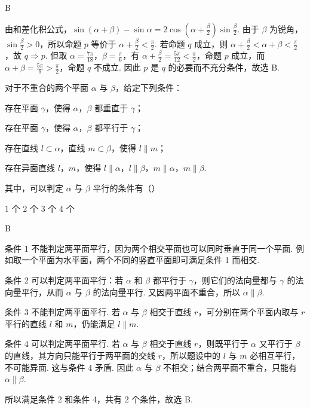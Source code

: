\begin{answer}
B
\end{answer}

\begin{solution}
由和差化积公式，\(\sin(\alpha+\beta)-\sin\alpha=2\cos\left(\alpha+\frac{\beta}{2}\right)\sin\frac{\beta}{2}\). 由于 \(\beta\) 为锐角，\(\sin\frac{\beta}{2}>0\)，所以命题 \(p\) 等价于 \(\alpha+\frac{\beta}{2}<\frac{\pi}{2}\). 若命题 \(q\) 成立，则 \(\alpha+\frac{\beta}{2}<\alpha+\beta<\frac{\pi}{2}\)，故 \(q\Rightarrow p\). 但取 \(\alpha=\frac{7\pi}{18}\)，\(\beta=\frac{\pi}{6}\)，有 \(\alpha+\frac{\beta}{2}=\frac{5\pi}{12}<\frac{\pi}{2}\)，命题 \(p\) 成立，而 \(\alpha+\beta=\frac{5\pi}{9}>\frac{\pi}{2}\)，命题 \(q\) 不成立. 因此 \(p\) 是 \(q\) 的必要而不充分条件，故选 B.
\end{solution}

\begin{problem}
对于不重合的两个平面 \(\alpha\) 与 \(\beta\)，给定下列条件：

\begin{circlelist}
\item 存在平面 \(\gamma\)，使得 \(\alpha\)，\(\beta\) 都垂直于 \(\gamma\)；
\item 存在平面 \(\gamma\)，使得 \(\alpha\)，\(\beta\) 都平行于 \(\gamma\)；
\item 存在直线 \(l \subset \alpha\)，直线 \(m \subset \beta\)，使得 \(l \parallel m\)；
\item 存在异面直线 \(l\)，\(m\)，使得 \(l \parallel \alpha\)，\(l \parallel \beta\)，\(m \parallel \alpha\)，\(m \parallel \beta\).
\end{circlelist}

其中，可以判定 \( \alpha \) 与 \( \beta \) 平行的条件有（\quad）

\choices
    {\(1\) 个}
    {\(2\) 个}
    {\(3\) 个}
    {\(4\) 个}
\end{problem}

\begin{answer}
B
\end{answer}

\begin{solution}
条件 1 不能判定两平面平行，因为两个相交平面也可以同时垂直于同一个平面. 例如取一个平面为水平面，两个不同的竖直平面即可满足条件 1 而相交.

条件 2 可以判定两平面平行：若 \(\alpha\) 和 \(\beta\) 都平行于 \(\gamma\)，则它们的法向量都与 \(\gamma\) 的法向量平行，从而 \(\alpha\) 与 \(\beta\) 的法向量平行. 又因两平面不重合，所以 \(\alpha\parallel\beta\).

条件 3 不能判定两平面平行. 若 \(\alpha\) 与 \(\beta\) 相交于直线 \(r\)，可分别在两个平面内取与 \(r\) 平行的直线 \(l\) 和 \(m\)，仍能满足 \(l\parallel m\).

条件 4 可以判定两平面平行. 若 \(\alpha\) 与 \(\beta\) 相交于直线 \(r\)，则既平行于 \(\alpha\) 又平行于 \(\beta\) 的直线，其方向只能平行于两平面的交线 \(r\)，所以题设中的 \(l\) 与 \(m\) 必相互平行，不可能异面. 这与条件 4 矛盾. 因此 \(\alpha\) 与 \(\beta\) 不相交；结合两平面不重合，只能有 \(\alpha\parallel\beta\).

所以满足条件 2 和条件 4，共有 2 个条件，故选 B.
\end{solution}

